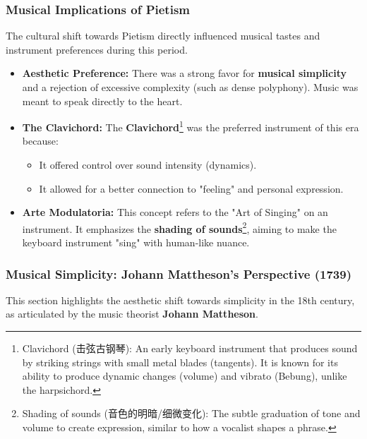 \documentclass[math,code]{amznotes}
\theoremstyle{remark}
\begin{document}
\subsubsection{Musical Implications of Pietism}
The cultural shift towards Pietism directly influenced musical tastes and instrument preferences during this period.
\begin{itemize}
    \item \textbf{Aesthetic Preference:} There was a strong favor for \textbf{musical simplicity} and a rejection of excessive complexity (such as dense polyphony). Music was meant to speak directly to the heart.
    \item \textbf{The Clavichord:} The \textbf{Clavichord}\footnote{Clavichord (击弦古钢琴): An early keyboard instrument that produces sound by striking strings with small metal blades (tangents). It is known for its ability to produce dynamic changes (volume) and vibrato (Bebung), unlike the harpsichord.} was the preferred instrument of this era because:
    \begin{itemize}
        \item It offered control over sound intensity (dynamics).
        \item It allowed for a better connection to "feeling" and personal expression.
    \end{itemize}
    \item \textbf{Arte Modulatoria:} This concept refers to the "Art of Singing" on an instrument. It emphasizes the \textbf{shading of sounds}\footnote{Shading of sounds (音色的明暗/细微变化): The subtle graduation of tone and volume to create expression, similar to how a vocalist shapes a phrase.}, aiming to make the keyboard instrument "sing" with human-like nuance.
\end{itemize}

\subsubsection{Musical Simplicity: Johann Mattheson's Perspective (1739)}

This section highlights the aesthetic shift towards simplicity in the 18th century, as articulated by the music theorist \textbf{Johann Mattheson}.
\end{document}
